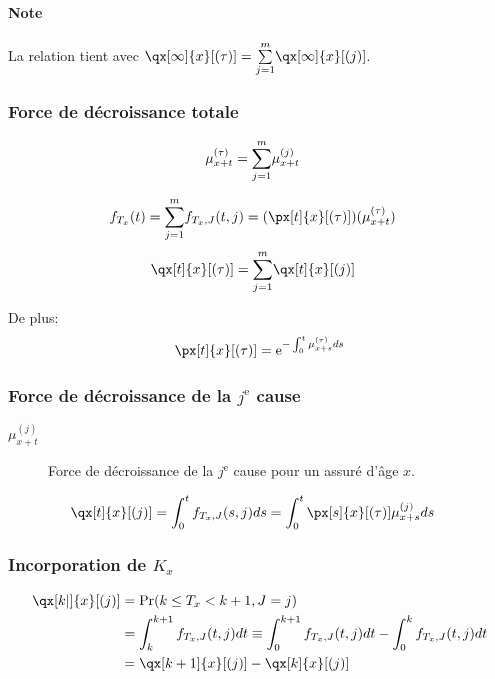 \documentclass[10pt, french]{article}
\begin{document}
\begin{multicols*}{2}
\paragraph{Note}	La relation tient avec $\qx[\infty]{x}[(\tau)]	=	\sumz{m}{j	=	1}\qx[\infty]{x}[(j)]$.

\subsubsection*{Force de décroissance totale}
\begin{align*}
	\mu_{x + t}^{(\tau)}
	&=	\overset{m}{\underset{j = 1}{\sum}} \mu_{x + t}^{(j)}
\end{align*}

\begin{align*}
	f_{T_{x}}(t)
	&=	\sumz{m}{j = 1}f_{T_{x}, J}(t, j)	
	=	(\px[t]{x}[(\tau)])(\mu_{x + t}^{(\tau)})
\end{align*}
\begin{align*}
	\qx[t]{x}[(\tau)]
	&=	\sumz{m}{j = 1} \qx[t]{x}[(j)]
\end{align*}

De plus:
\begin{align*}
	\px[t]{x}[(\tau)]
	=	\textrm{e}^{-\int_{0}^{t} \mu_{x + s}^{(\tau)}ds}
\end{align*}

\subsubsection*{Force de décroissance de la $j^{\text{e}}$ cause}
\begin{description}
	\item[$\mu_{x + t}^{(j)}$]	Force de décroissance de la $j^{\text{e}}$ cause pour un assuré d'âge $x$.
\end{description}
\begin{align*}
	\qx[t]{x}[(j)]
	&=	\int_{0}^{t} f_{T_{x}, J}(s, j)ds
	=	\int_{0}^{t} \px[s]{x}[(\tau)] \mu_{x + s}^{(j)}ds
\end{align*}

\subsubsection*{Incorporation de $K_{x}$}
\begin{align*}
	\qx[k|]{x}[(j)]
	&=	\Pr(k \leq T_{x} < k + 1, J = j)	\\
	&=	\int_{k}^{k + 1} f_{T_{x}, J}(t, j)dt
	\equiv	\int_{0}^{k + 1} f_{T_{x}, J}(t, j)dt - \int_{0}^{k} f_{T_{x}, J}(t, j)dt	\\
	&=	\qx[k + 1]{x}[(j)] - \qx[k]{x}[(j)]
\end{align*}


\end{multicols*}
\end{document}
